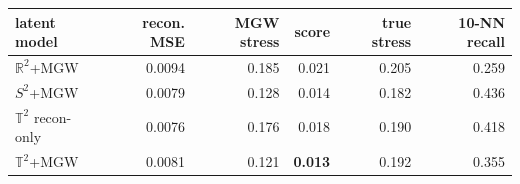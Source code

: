 \begin{tabular}{lrrrrr}
\toprule
latent model & recon. MSE & MGW stress & score & true stress & 10-NN recall \\
\midrule
$\mathbb{R}^2$+MGW & 0.0094 & 0.185 & 0.021 & 0.205 & 0.259 \\
$S^2$+MGW & 0.0079 & 0.128 & 0.014 & 0.182 & 0.436 \\
$\mathbb{T}^2$ recon-only & 0.0076 & 0.176 & 0.018 & 0.190 & 0.418 \\
$\mathbb{T}^2$+MGW & 0.0081 & 0.121 & \textbf{0.013} & 0.192 & 0.355 \\
\bottomrule
\end{tabular}
